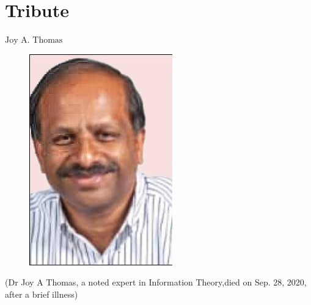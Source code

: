 \chapter{Tribute}




\vskip 0.8cm

\begin{center}
{\large\uppercase{$\text{Joy A. Thomas}$}} 


\vskip -6pt

\end{center}

\vskip 2cm




\vfill




\newpage



\begin{figure}[H]
\centering
\includegraphics[scale=2]{src/Figures/fig01.jpg}
\end{figure}

\begin{center}
(Dr Joy A Thomas, a noted expert in Information Theory,\break died on Sep. 28, 2020, after a brief illness)
\end{center}


